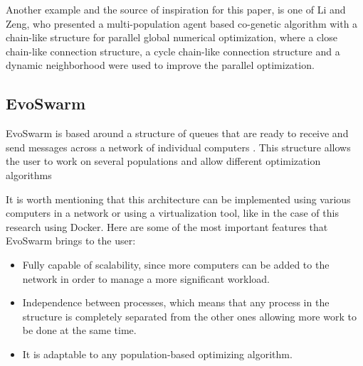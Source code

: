 \documentclass[runningheads]{llncs}
\begin{document}
Another example and the source of inspiration for this paper, is one
of Li and Zeng, who presented a multi-population agent based
co-genetic algorithm with a chain-like structure for parallel global
numerical optimization, where a close chain-like connection structure,
a cycle chain-like connection structure and a dynamic neighborhood
were used to improve the parallel optimization\cite{b17}. %


\subsection{EvoSwarm}

EvoSwarm is based around a structure of queues that are ready to
receive and send messages across a network of individual computers
\cite{b18}. %
This structure  allows the user to work on several populations and
allow different optimization algorithms %


It is worth mentioning that this architecture can be implemented using various
computers in a network or using a virtualization tool, like in the case of this
research using Docker. Here are some of the most important features that
EvoSwarm brings to the user:

\begin{itemize} 
  
  \item Fully capable of scalability, since more computers can be added to the
  network in order to manage a more significant workload.
    
    \item Independence between processes, which means that any process in the
    structure is completely separated from the other ones allowing more work to
    be done at the same time.
    
    \item It is adaptable to any population-based optimizing algorithm.
\end{itemize}
\end{document}
